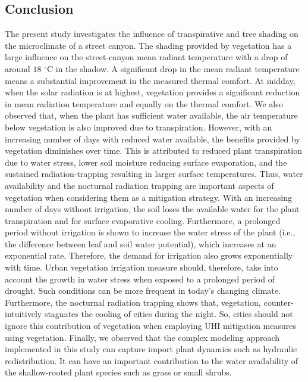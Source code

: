 
\subsection{Conclusion}

The present study investigates the influence of transpirative and tree shading on the microclimate of a street canyon. The shading provided by vegetation has a large influence on the street-canyon mean radiant temperature with a drop of around $18$ $^{\circ}$C in the shadow. A significant drop in the mean radiant temperature means a substantial improvement in the measured thermal comfort. At midday, when the solar radiation is at highest, vegetation provides a significant reduction in mean radiation temperature and equally on the thermal comfort. We also observed that, when the plant has sufficient water available, the air temperature below vegetation is also improved due to transpiration. However, with an increasing number of days with reduced water available, the benefits provided by vegetation diminishes over time. This is attributed to reduced plant transpiration due to water stress, lower soil moisture reducing surface evaporation, and the sustained radiation-trapping resulting in larger surface temperatures. Thus, water availability and the nocturnal radiation trapping are important aspects of vegetation when considering them as a mitigation strategy. With an increasing number of days without irrigation, the soil loses the available water for the plant transpiration and for surface evaporative cooling. Furthermore, a prolonged period without irrigation is shown to increase the water stress of the plant (i.e., the difference between leaf and soil water potential), which increases at an exponential rate. Therefore, the demand for irrigation also grows exponentially with time. Urban vegetation irrigation measure should, therefore, take into account the growth in water stress when exposed to a prolonged period of drought. Such conditions can be more frequent in today's changing climate. Furthermore, the nocturnal radiation trapping shows that, vegetation, counter-intuitively stagnates the cooling of cities during the night. So, cities should not ignore this contribution of vegetation when employing UHI mitigation measures using vegetation. Finally, we observed that the complex modeling approach implemented in this study can capture import plant dynamics such as hydraulic redistribution. It can have an important contribution to the water availability of the shallow-rooted plant species such as grass or small shrubs.

